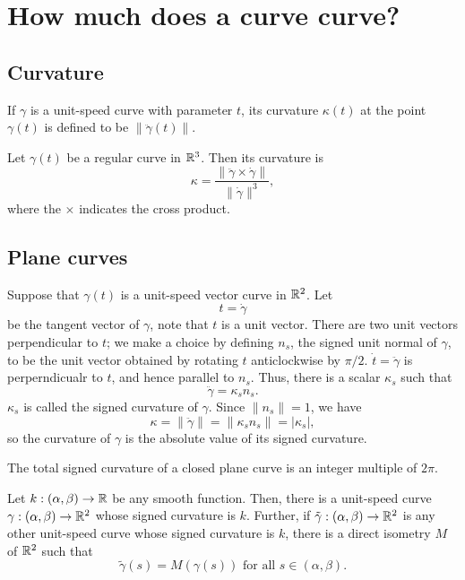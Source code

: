 \section{How much does a curve curve?}

\subsection{Curvature}

\begin{defn}
  If $\gamma$ is a unit-speed curve with parameter $t$, its curvature $\kappa(t)$
  at the point $\gamma(t)$ is defined to be $\|\ddot{\gamma}(t)\|$.
\end{defn}

\begin{proposition}
  Let $\gamma(t)$ be a regular curve in $\mathbb{R}^3$. Then its curvature is
  \[
    \kappa = \frac{\|\ddot{\gamma} \times \dot{\gamma}\|}{\|\dot{\gamma}\|^3},
  \]
  where the $\times$ indicates the cross product.
\end{proposition}

\subsection{Plane curves}

Suppose that $\gamma(t)$ is a unit-speed vector curve in $\mathbb{R}^2$. Let
\[
  t = \dot{\gamma}
\]
be the tangent vector of $\gamma$, note that $t$ is a unit vector.
There are two unit vectors perpendicular to $t$; we make a choice by defining $n_s$,
the signed unit normal of $\gamma$, to be the unit vector obtained by rotating $t$
anticlockwise by $\pi/2$.
$\dot{t} = \ddot{\gamma}$ is perperndicualr to $t$, and hence parallel to $n_s$.
Thus, there is a scalar $\kappa_s$ such that
\[
  \ddot{\gamma} = \kappa_s n_s.
\]
$\kappa_s$ is called the signed curvature of $\gamma$. Since $\|n_s\| = 1$, we have
\[
  \kappa = \|\ddot{\gamma}\| = \|\kappa_s n_s\| = |\kappa_s|,
\]
so the curvature of $\gamma$ is the absolute value of its signed curvature.


\begin{corollary}
  The total signed curvature of a closed plane curve is an integer multiple of $2\pi$.
\end{corollary}

\begin{theorem}
  Let $k: (\alpha, \beta) \to \mathbb{R}$ be any smooth function.
  Then, there is a unit-speed curve
  $\gamma: (\alpha, \beta) \to \mathbb{R}^2$ whose signed curvature is $k$.
  Further, if $\tilde \gamma: (\alpha, \beta) \to \mathbb{R}^2$ is any other unit-speed curve
  whose signed curvature is $k$, there is a direct isometry $M$ of $\mathbb{R}^2$ such that
  \[
    \tilde \gamma(s) = M(\gamma(s)) \text{ for all } s \in (\alpha, \beta).
  \]
\end{theorem}

